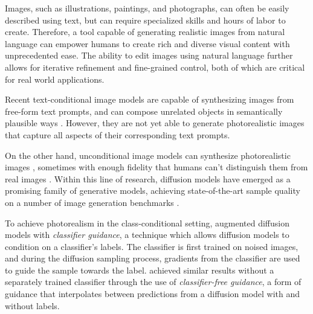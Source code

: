 \documentclass{article}
\begin{document}

Images, such as illustrations, paintings, and photographs, can often be easily described using text, but can require specialized skills and hours of labor to create. Therefore, a tool capable of generating realistic images from natural language can empower humans to create rich and diverse visual content with unprecedented ease. The ability to edit images using natural language further allows for iterative refinement and fine-grained control, both of which are critical for real world applications.

Recent text-conditional image models are capable of synthesizing images from free-form text prompts, and can compose unrelated objects in semantically plausible ways \citep{attngan,dmgan,dfgan,dalle,xmcgan}. However, they are not yet able to generate photorealistic images that capture all aspects of their corresponding text prompts.

On the other hand, unconditional image models can synthesize photorealistic images \cite{biggan,stylegan,stylegan2,vqvae2}, sometimes with enough fidelity that humans can't distinguish them from real images \cite{zhou2019hype}. Within this line of research, diffusion models \cite{dickstein,scorematching} have emerged as a promising family of generative models, achieving state-of-the-art sample quality on a number of image generation benchmarks \citep{ddpm,sotapaper,cascaded}.

To achieve photorealism in the class-conditional setting, \citet{sotapaper} augmented diffusion models with \textit{classifier guidance}, a technique which allows diffusion models to condition on a classifier's labels. The classifier is first trained on noised images, and during the diffusion sampling process, gradients from the classifier are used to guide the sample towards the label. \citet{uncond} achieved similar results without a separately trained classifier through the use of \textit{classifier-free guidance}, a form of guidance that interpolates between predictions from a diffusion model with and without labels.
\end{document}
